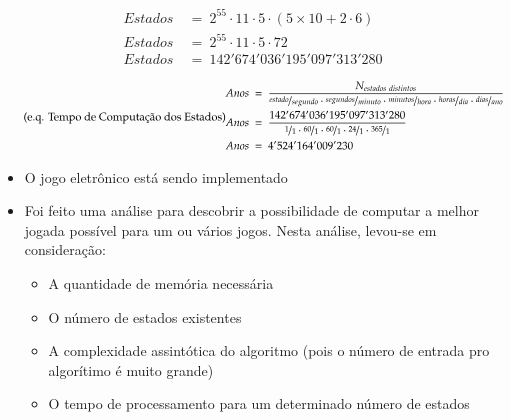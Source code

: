 \begin{equation} \label{eq_poda1} \tag{e.q. Poda por posição}
\begin{split}
Estados\ &=\ 2^{55}\cdot 11\cdot 5\cdot (5\times 10 + 2\cdot 6)\\
Estados\ &=\ 2^{55}\cdot 11\cdot 5\cdot 72\\
Estados\ &=\ 142'674'036'195'097'313'280
\end{split}
\end{equation}

\begin{equation} \label{eq_anos_estados} \tag{e.q. Tempo de Computação dos Estados}
\begin{split}
Anos\ &=\ \dfrac{N_{estados\ distintos}}{\nicefrac{estado}{segundo}\cdot\nicefrac{segundos}{minuto}\cdot\nicefrac{minutos}{hora}\cdot\nicefrac{horas}{dia}\cdot\nicefrac{dias}{ano}}\\
Anos\ &=\ \dfrac{142'674'036'195'097'313'280}{\nicefrac{1}{1}\cdot\nicefrac{60}{1}\cdot\nicefrac{60}{1}\cdot\nicefrac{24}{1}\cdot\nicefrac{365}{1}}\\
Anos\ &=\ 4'524'164'009'230
\end{split}
\end{equation}


\begin{itemize}
\item
  O jogo eletrônico está sendo implementado
\item
  Foi feito uma análise para descobrir a possibilidade de computar a
  melhor jogada possível para um ou vários jogos. Nesta análise,
  levou-se em consideração:

  \begin{itemize}
  \tightlist
  \item
    A quantidade de memória necessária
  \item
    O número de estados existentes
  \item
    A complexidade assintótica do algoritmo (pois o número de entrada
    pro algorítimo é muito grande)
  \item
    O tempo de processamento para um determinado número de estados
  \end{itemize}
\end{itemize}
